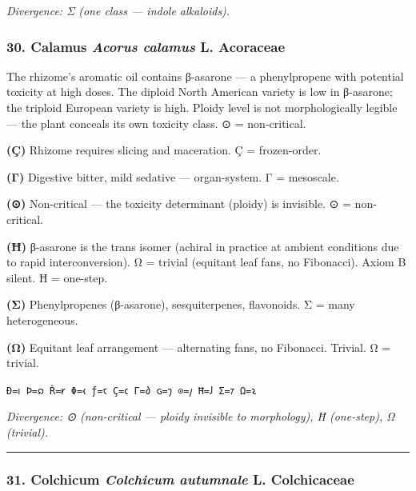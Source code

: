 \documentclass[12pt,a4paper]{article}
\begin{document}
\emph{Divergence: Σ (one class --- indole alkaloids).}

\hypertarget{calamus-acorus-calamus-l.-acoraceae}{%
\subsubsection{\texorpdfstring{30. Calamus \textbar{} \emph{Acorus
calamus} L. \textbar{}
Acoraceae}{30. Calamus \textbar{} Acorus calamus L. \textbar{} Acoraceae}}\label{calamus-acorus-calamus-l.-acoraceae}}

The rhizome's aromatic oil contains β-asarone --- a phenylpropene with
potential toxicity at high doses. The diploid North American variety is
low in β-asarone; the triploid European variety is high. Ploidy level is
not morphologically legible --- the plant conceals its own toxicity
class. ⊙ = non-critical.

\textbf{(Ç)} Rhizome requires slicing and maceration. Ç = frozen-order.

\textbf{(Γ)} Digestive bitter, mild sedative --- organ-system. Γ =
mesoscale.

\textbf{(⊙)} Non-critical --- the toxicity determinant (ploidy) is
invisible. ⊙ = non-critical.

\textbf{(Ħ)} β-asarone is the trans isomer (achiral in practice at
ambient conditions due to rapid interconversion). Ω = trivial (equitant
leaf fans, no Fibonacci). Axiom B silent. Ħ = one-step.

\textbf{(Σ)} Phenylpropenes (β-asarone), sesquiterpenes, flavonoids. Σ =
many heterogeneous.

\textbf{(Ω)} Equitant leaf arrangement --- alternating fans, no
Fibonacci. Trivial. Ω = trivial.

\texttt{Ð=𐑦\ Þ=𐑸\ Ř=𐑾\ Φ=𐑬\ ƒ=𐑱\ Ç=𐑤\ Γ=𐑔\ ɢ=𐑠\ ⊙=𐑢\ Ħ=𐑓\ Σ=𐑳\ Ω=𐑷}

\emph{Divergence: ⊙ (non-critical --- ploidy invisible to morphology), Ħ
(one-step), Ω (trivial).}

\begin{center}\rule{0.5\linewidth}{0.5pt}\end{center}

\hypertarget{colchicum-colchicum-autumnale-l.-colchicaceae}{%
\subsubsection{\texorpdfstring{31. Colchicum \textbar{} \emph{Colchicum
autumnale} L. \textbar{}
Colchicaceae}{31. Colchicum \textbar{} Colchicum autumnale L. \textbar{} Colchicaceae}}\label{colchicum-colchicum-autumnale-l.-colchicaceae}}
\end{document}
